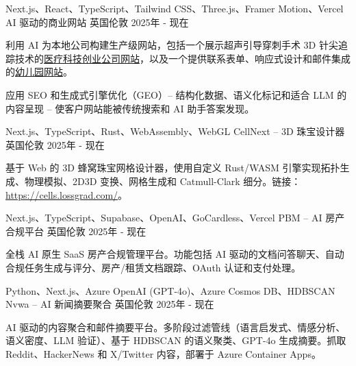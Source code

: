 \begin{cventries}
\cventry
{Next.js、React、TypeScript、Tailwind CSS、Three.js、Framer Motion、Vercel} %
{AI 驱动的商业网站} %
{英国伦敦} %
{2025年 - 现在} %
{
\begin{cvitems} %
\item {利用 AI 为本地公司构建生产级网站，包括一个展示超声引导穿刺手术 3D 针尖追踪技术的\href{https://beacon.lossgrad.com/}{医疗科技创业公司网站}，以及一个提供联系表单、响应式设计和邮件集成的\href{https://www.wonderlanddaynursery.co.uk/}{幼儿园网站}。}
\item {应用 SEO 和生成式引擎优化（GEO）-- 结构化数据、语义化标记和适合 LLM 的内容呈现 -- 使客户网站能被传统搜索和 AI 助手答案发现。}
\end{cvitems}
}

\cventry
{Next.js、TypeScript、Rust、WebAssembly、WebGL} %
{CellNext -- 3D 珠宝设计器} %
{英国伦敦} %
{2025年 - 现在} %
{
\begin{cvitems} %
\item {基于 Web 的 3D 蜂窝珠宝网格设计器，使用自定义 Rust/WASM 引擎实现拓扑生成、物理模拟、2D\textrightarrow3D 变换、网格生成和 Catmull-Clark 细分。链接：\href{https://cells.lossgrad.com/}{https://cells.lossgrad.com/}。}
\end{cvitems}
}

\cventry
{Next.js、TypeScript、Supabase、OpenAI、GoCardless、Vercel} %
{PBM -- AI 房产合规平台} %
{英国伦敦} %
{2025年 - 现在} %
{
\begin{cvitems} %
\item {全栈 AI 原生 SaaS 房产合规管理平台。功能包括 AI 驱动的文档问答聊天、自动合规任务生成与评分、房产/租赁文档跟踪、OAuth 认证和支付处理。}
\end{cvitems}
}

\cventry
{Python、Next.js、Azure OpenAI (GPT-4o)、Azure Cosmos DB、HDBSCAN} %
{Nvwa -- AI 新闻摘要聚合} %
{英国伦敦} %
{2025年 - 现在} %
{
\begin{cvitems} %
\item {AI 驱动的内容聚合和邮件摘要平台。多阶段过滤管线（语言启发式、情感分析、语义密度、LLM 验证）、基于 HDBSCAN 的语义聚类、GPT-4o 生成摘要。抓取 Reddit、HackerNews 和 X/Twitter 内容，部署于 Azure Container Apps。}
\end{cvitems}
}


\end{cventries}

